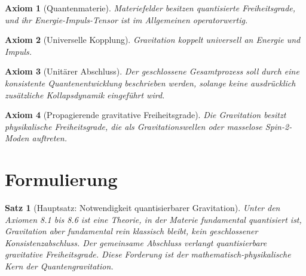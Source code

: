 \documentclass[11pt,a4paper]{book}
\newtheorem{satz}{Satz}[chapter]
\newtheorem{axiom}{Axiom}[chapter]
\theoremstyle{remark}
\begin{document}
\begin{axiom}[Quantenmaterie]
Materiefelder besitzen quantisierte Freiheitsgrade, und ihr Energie-Impuls-Tensor ist im Allgemeinen operatorwertig.
\end{axiom}

\begin{axiom}[Universelle Kopplung]
Gravitation koppelt universell an Energie und Impuls.
\end{axiom}

\begin{axiom}[Unitärer Abschluss]
Der geschlossene Gesamtprozess soll durch eine konsistente Quantenentwicklung beschrieben werden, solange keine ausdrücklich zusätzliche Kollapsdynamik eingeführt wird.
\end{axiom}

\begin{axiom}[Propagierende gravitative Freiheitsgrade]
Die Gravitation besitzt physikalische Freiheitsgrade, die als Gravitationswellen oder masselose Spin-2-Moden auftreten.
\end{axiom}

\section{Formulierung}
\begin{satz}[Hauptsatz: Notwendigkeit quantisierbarer Gravitation]
Unter den Axiomen 8.1 bis 8.6 ist eine Theorie, in der Materie fundamental quantisiert ist, Gravitation aber fundamental rein klassisch bleibt, kein geschlossener Konsistenzabschluss. Der gemeinsame Abschluss verlangt quantisierbare gravitative Freiheitsgrade. Diese Forderung ist der mathematisch-physikalische Kern der Quantengravitation.
\end{satz}
\end{document}
